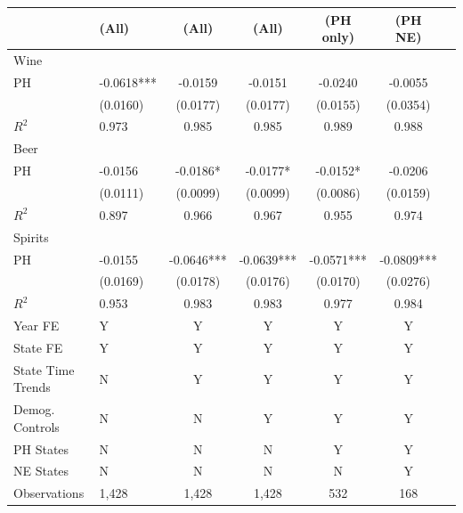 \begin{tabular}{llccccc}
\toprule
 & (All) & (All) & (All) & (PH only) & (PH NE) \\ \midrule
Wine\\
\hline
PH & -0.0618*** & -0.0159 & -0.0151 & -0.0240 & -0.0055  \\
 & (0.0160) & (0.0177) & (0.0177) & (0.0155) & (0.0354) \\
 $R^2$ & 0.973 & 0.985 & 0.985 & 0.989 & 0.988 \\
\midrule
Beer\\
\hline
PH & -0.0156 & -0.0186* & -0.0177* & -0.0152* & -0.0206  \\
 & (0.0111) & (0.0099) & (0.0099) & (0.0086) & (0.0159) \\
 $R^2$ & 0.897 & 0.966 & 0.967 & 0.955 & 0.974 \\
\midrule
Spirits\\
\hline
PH & -0.0155 & -0.0646*** & -0.0639*** & -0.0571*** & -0.0809***  \\
 & (0.0169) & (0.0178) & (0.0176) & (0.0170) & (0.0276) \\
 $R^2$ & 0.953 & 0.983 & 0.983 & 0.977 & 0.984 \\
 \midrule
  Year FE & Y & Y & Y & Y & Y\\
  State FE & Y & Y & Y & Y & Y\\
  State Time Trends & N & Y & Y & Y & Y \\
  Demog. Controls & N & N & Y & Y & Y \\
  PH States & N & N & N & Y & Y \\
  NE States & N & N & N & N & Y  \\
Observations & 1,428 & 1,428 & 1,428 & 532 & 168 \\
\end{tabular}
